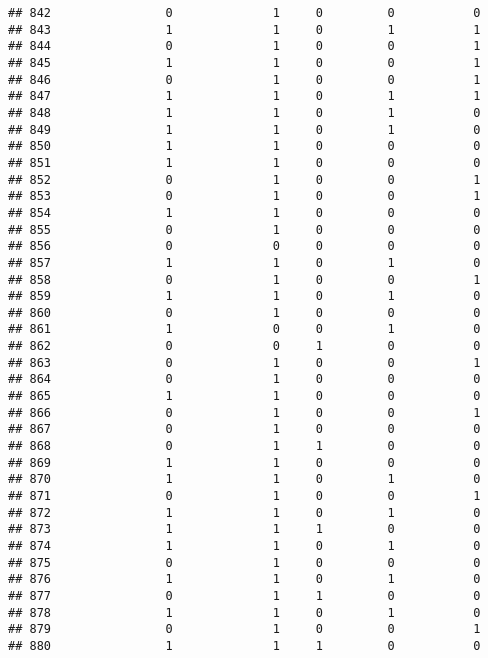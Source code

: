 \documentclass[]{article}
\begin{document}
\begin{verbatim}
## 842                0              1     0         0           0
## 843                1              1     0         1           1
## 844                0              1     0         0           1
## 845                1              1     0         0           1
## 846                0              1     0         0           1
## 847                1              1     0         1           1
## 848                1              1     0         1           0
## 849                1              1     0         1           0
## 850                1              1     0         0           0
## 851                1              1     0         0           0
## 852                0              1     0         0           1
## 853                0              1     0         0           1
## 854                1              1     0         0           0
## 855                0              1     0         0           0
## 856                0              0     0         0           0
## 857                1              1     0         1           0
## 858                0              1     0         0           1
## 859                1              1     0         1           0
## 860                0              1     0         0           0
## 861                1              0     0         1           0
## 862                0              0     1         0           0
## 863                0              1     0         0           1
## 864                0              1     0         0           0
## 865                1              1     0         0           0
## 866                0              1     0         0           1
## 867                0              1     0         0           0
## 868                0              1     1         0           0
## 869                1              1     0         0           0
## 870                1              1     0         1           0
## 871                0              1     0         0           1
## 872                1              1     0         1           0
## 873                1              1     1         0           0
## 874                1              1     0         1           0
## 875                0              1     0         0           0
## 876                1              1     0         1           0
## 877                0              1     1         0           0
## 878                1              1     0         1           0
## 879                0              1     0         0           1
## 880                1              1     1         0           0

\end{verbatim}
\end{document}
